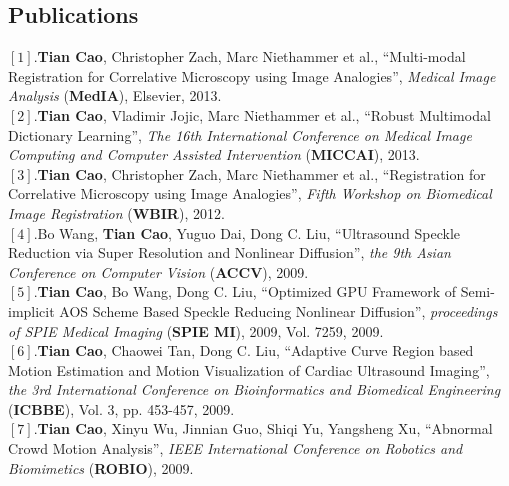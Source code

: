\documentclass[line,margin]{res}
\begin{document}
\begin{resume}
\vspace{-.1in}


\section{\sc Publications}  
\smallskip
$[1]$.\textbf{Tian Cao}, Christopher Zach, Marc Niethammer et al., ``Multi-modal Registration for Correlative Microscopy using Image Analogies'', \emph{Medical Image Analysis} (\textbf{MedIA}), Elsevier, 2013. \vspace{.05in}\\
$[2]$.\textbf{Tian Cao}, Vladimir Jojic, Marc Niethammer et al., ``Robust Multimodal Dictionary Learning'', \emph{The 16th International Conference on Medical Image Computing and Computer Assisted Intervention} (\textbf{MICCAI}), 2013. \vspace{.05in}\\ 
$[3]$.\textbf{Tian Cao}, Christopher Zach, Marc Niethammer et al., ``Registration for Correlative Microscopy using Image Analogies'',  \emph{Fifth Workshop on Biomedical Image Registration} (\textbf{WBIR}), 2012. \vspace{.05in}\\%
$[4]$.Bo Wang, \textbf{Tian Cao}, Yuguo Dai, Dong C. Liu, ``Ultrasound Speckle Reduction via Super Resolution and Nonlinear Diffusion'',  \emph{the 9th Asian Conference on Computer Vision} (\textbf{ACCV}), 2009. \vspace{.05in}\\
$[5]$.\textbf{Tian Cao}, Bo Wang, Dong C. Liu, ``Optimized GPU Framework of Semi-implicit AOS
Scheme Based Speckle Reducing Nonlinear Diﬀusion'',  \emph{proceedings of SPIE Medical Imaging} (\textbf{SPIE MI}), 2009, Vol. 7259, 2009.\vspace{.05in}\\%
$[6]$.\textbf{Tian Cao}, Chaowei Tan, Dong C. Liu, ``Adaptive Curve Region based Motion Estimation and Motion Visualization of Cardiac Ultrasound Imaging'',  \emph{the 3rd International Conference on Bioinformatics and Biomedical Engineering} (\textbf{ICBBE}), Vol. 3, pp. 453-457, 2009.\vspace{.05in}\\
$[7]$.\textbf{Tian Cao}, Xinyu Wu, Jinnian Guo, Shiqi Yu, Yangsheng Xu, ``Abnormal Crowd Motion Analysis'', \emph{IEEE International Conference on Robotics and Biomimetics} (\textbf{ROBIO}), 2009.

%


\end{resume}
\end{document}
